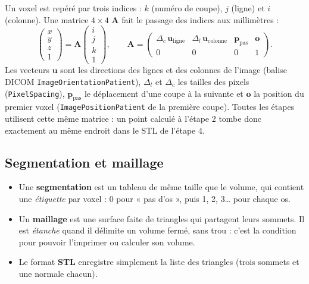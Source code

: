 \documentclass[11pt,a4paper]{article}
\newcommand{\vb}[1]{\mathbf{#1}}
\begin{document}
Un voxel est repéré par trois indices : $k$ (numéro de coupe), $j$ (ligne) et $i$ (colonne). Une matrice $4 \times 4$
$\vb{A}$ fait le passage des indices aux millimètres :
\begin{equation}
  \begin{pmatrix} x \\ y \\ z \\ 1 \end{pmatrix}
  = \vb{A} \begin{pmatrix} i \\ j \\ k \\ 1 \end{pmatrix},
  \qquad
  \vb{A} = \begin{pmatrix} \Delta_c\,\vb{u}_{\text{ligne}} & \Delta_l\,\vb{u}_{\text{colonne}} & \vb{p}_{\text{pas}} & \vb{o} \\ 0 & 0 & 0 & 1 \end{pmatrix}.
  \label{eq-affine}
\end{equation}
Les vecteurs $\vb{u}$ sont les directions des lignes et des colonnes de l'image (balise DICOM
\texttt{ImageOrientationPatient}), $\Delta_l$ et $\Delta_c$ les tailles des pixels (\texttt{PixelSpacing}),
$\vb{p}_{\text{pas}}$ le déplacement d'une coupe à la suivante et $\vb{o}$ la position du premier voxel
(\texttt{ImagePositionPatient} de la première coupe). Toutes les étapes utilisent cette même matrice : un point
calculé à l'étape 2 tombe donc exactement au même endroit dans le STL de l'étape 4.

\subsection{Segmentation et maillage}

\begin{itemize}
  \item Une \textbf{segmentation} est un tableau de même taille que le volume, qui contient une \emph{étiquette} par
  voxel : 0 pour « pas d'os », puis 1, 2, 3\ldots{} pour chaque os.
  \item Un \textbf{maillage} est une surface faite de triangles qui partagent leurs sommets. Il est \emph{étanche}
  quand il délimite un volume fermé, sans trou : c'est la condition pour pouvoir l'imprimer ou calculer son volume.
  \item Le format \textbf{STL} enregistre simplement la liste des triangles (trois sommets et une normale chacun).
\end{itemize}
\end{document}
